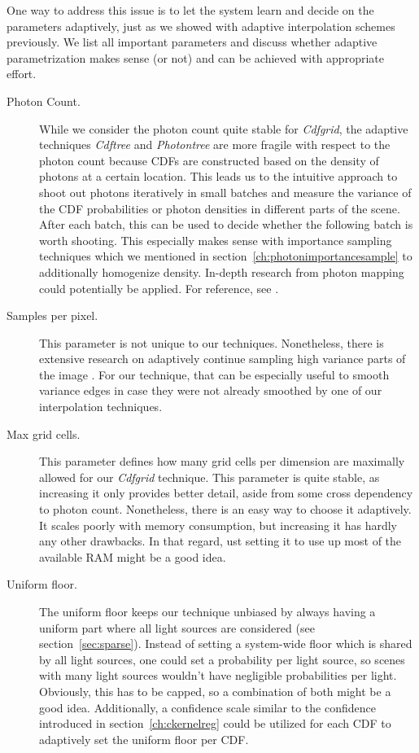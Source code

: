 One way to address this issue is to let the system learn and decide on the parameters adaptively, just as we showed with adaptive interpolation schemes previously. We list all important parameters and discuss whether adaptive parametrization makes sense (or not) and can be achieved with appropriate effort.

\begin{description}
    \item[Photon Count.] While we consider the photon count quite stable for \textit{Cdfgrid}, the adaptive techniques \textit{Cdftree} and \textit{Photontree} are more fragile with respect to the photon count because CDFs are constructed based on the density of photons at a certain location. This leads us to the intuitive approach to shoot out photons iteratively in small batches and measure the variance of the CDF probabilities or photon densities in different parts of the scene. After each batch, this can be used to decide whether the following batch is worth shooting. This especially makes sense with importance sampling techniques which we mentioned in section~\ref{ch:photonimportancesample} to additionally homogenize density. In-depth research from photon mapping could potentially be applied. For reference, see \parencite{DBLP:journals/vc/ZhengZ15}.
    \item[Samples per pixel.] This parameter is not unique to our techniques. Nonetheless, there is extensive research on adaptively continue sampling high variance parts of the image \parencite{zwicker15star}. For our technique, that can be especially useful to smooth variance edges in case they were not already smoothed by one of our interpolation techniques.
    \item[Max grid cells.] This parameter defines how many grid cells per dimension are maximally allowed for our \textit{Cdfgrid} technique. This parameter is quite stable, as increasing it only provides better detail, aside from some cross dependency to photon count. Nonetheless, there is an easy way to choose it adaptively. It scales poorly with memory consumption, but increasing it has hardly any other drawbacks. In that regard, ust setting it to use up most of the available RAM might be a good idea.
    \item[Uniform floor.] The uniform floor keeps our technique unbiased by always having a uniform part where all light sources are considered (see section~\ref{sec:sparse}). Instead of setting a system-wide floor which is shared by all light sources, one could set a probability per light source, so scenes with many light sources wouldn't have negligible probabilities per light. Obviously, this has to be capped, so a combination of both might be a good idea. Additionally, a confidence scale similar to the confidence introduced in section~\ref{ch:ckernelreg} could be utilized for each CDF to adaptively set the uniform floor per CDF.

\end{description}
